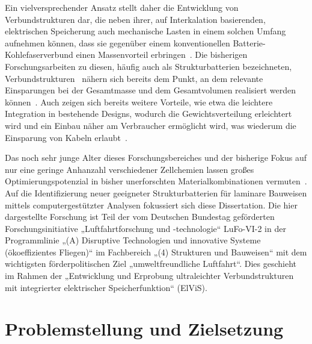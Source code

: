 Ein vielversprechender Ansatz stellt daher die Entwicklung von Verbundstrukturen dar, die neben ihrer, auf Interkalation basierenden, elektrischen Speicherung auch mechanische Lasten in einem solchen Umfang aufnehmen können, dass sie gegenüber einem konventionellen Batterie-Kohlefaserverbund einen Massenvorteil erbringen~\cite{Wong2007,Carlson2013}. Die bisherigen Forschungsarbeiten zu diesen, häufig auch als Strukturbatterien bezeichneten, Verbundstrukturen~\cite{Johannisson2018,Liu2009,Ekstedt2010,Wang2019,Zhao2020,Yin2020,Lutkenhaus2020,Fu2021,Jin2021,Kalnaus2021} nähern sich bereits dem Punkt, an dem relevante Einsparungen bei der Gesamtmasse und dem Gesamtvolumen realisiert werden können~\cite{Wetzel2004,Snyder2015,Carlstedt2020a,Asp2014,Johannisson2019}. Auch zeigen sich bereits weitere Vorteile, wie etwa die leichtere Integration in bestehende Designs, wodurch die Gewichtsverteilung erleichtert wird und ein Einbau näher am Verbraucher ermöglicht wird, was wiederum die Einsparung von Kabeln erlaubt~\cite{Thomas2004,Danzi2021,Moyer2020,Wang2020}. %

Das noch sehr junge Alter dieses Forschungsbereiches und der bisherige Fokus auf nur eine geringe Anhanzahl verschiedener Zellchemien lassen großes Optimierungspotenzial in bisher unerforschten Materialkombinationen vermuten~\cite{Asp2019}. Auf die Identifizierung neuer geeigneter Strukturbatterien für laminare Bauweisen mittels computergestützter Analysen fokussiert sich diese Dissertation.
Die hier dargestellte Forschung ist Teil der vom Deutschen Bundestag geförderten Forschungsinitiative „Luftfahrtforschung und -technologie“ LuFo-VI-2 in der Programmlinie „(A) Disruptive Technologien und innovative Systeme (ökoeffizientes Fliegen)“ im Fachbereich „(4) Strukturen und Bauweisen“ mit dem wichtigsten förderpolitischen Ziel „umweltfreundliche Luftfahrt“. Dies geschieht im Rahmen der „Entwicklung und Erprobung ultraleichter Verbundstrukturen mit integrierter elektrischer Speicherfunktion“ (ElViS).


\section{\label{sec:Motivation_Zielstellung}Problemstellung und Zielsetzung}

